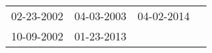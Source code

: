 \begin{supertabular}{llll}
 02-23-2002 &  04-03-2003 &  04-02-2014 \\
 10-09-2002 &  01-23-2013 &             \\
\end{supertabular}
